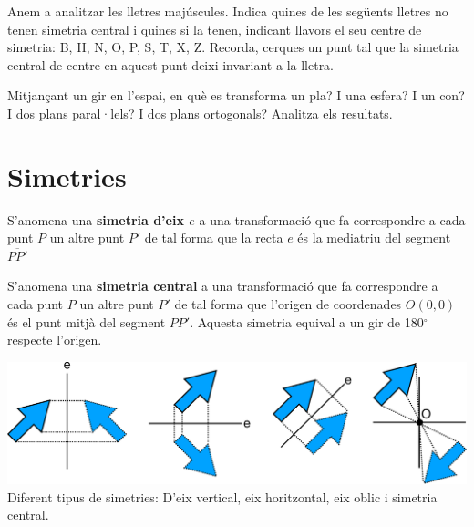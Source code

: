 \begin{mylist}

\exer  Anem a analitzar les lletres majúscules. Indica quines de les següents lletres no tenen simetria central i quines si la tenen, indicant llavors el seu centre de simetria: B, H, N, O, P, S, T, X, Z. Recorda, cerques un punt tal que la simetria central de centre en aquest punt deixi invariant a la lletra.


\exer  Mitjançant un gir en l'espai, en què es transforma un pla? I una esfera? I un con? I dos plans paral·lels? I dos plans ortogonals? Analitza els resultats.

\end{mylist}
 

\pagebreak
\section{Simetries}

\begin{theorybox}
	S'anomena una \textbf{simetria d'eix $e$} a una transformació que fa correspondre a cada punt $P$ un altre punt $P'$ de tal forma que la recta $e$ és la mediatriu del segment $\overline{PP'}$
	
	S'anomena una \textbf{simetria central} a una transformació que fa correspondre a cada punt $P$ un altre punt $P'$ de tal forma que l'origen de coordenades $O(0,0)$ és el punt mitjà del segment $\overline{PP'}$. Aquesta simetria equival a un gir de 180${}^\circ$ respecte l'origen.
	
	\begin{center}
		\includegraphics[width=\textwidth]{img-10/simetries}
			\footnotesize
		Diferent tipus de simetries: D'eix vertical, eix horitzontal, eix oblic i simetria central.
	\end{center}
\end{theorybox}

